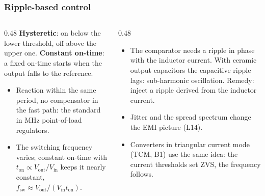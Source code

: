 \begin{frame}
	\frametitle{Ripple-based control}
	\begin{columns}[T]
		\begin{column}{0.48\textwidth}
			\small
			\textbf{Hysteretic}: on below the lower threshold, off above the upper one. \textbf{Constant on-time}: a fixed on-time starts when the output falls to the reference.
			\begin{itemize}
				\item Reaction within the same period, no compensator in the fast path: the standard in MHz point-of-load regulators.
				\item The switching frequency varies; constant on-time with $t_\mathrm{on}\propto V_\mathrm{out}/V_\mathrm{in}$ keeps it nearly constant, $f_\mathrm{sw}\approx V_\mathrm{out}/(V_\mathrm{in}t_\mathrm{on})$.
			\end{itemize}
		\end{column}
		\begin{column}{0.48\textwidth}
			\small
			\begin{itemize}
				\item The comparator needs a ripple in phase with the inductor current. With ceramic output capacitors the capacitive ripple lags: sub-harmonic oscillation. Remedy: inject a ripple derived from the inductor current.
				\item Jitter and the spread spectrum change the EMI picture (L14).
				\item Converters in triangular current mode (TCM, B1) use the same idea: the current thresholds set ZVS, the frequency follows.
			\end{itemize}
		\end{column}
	\end{columns}
\end{frame}

